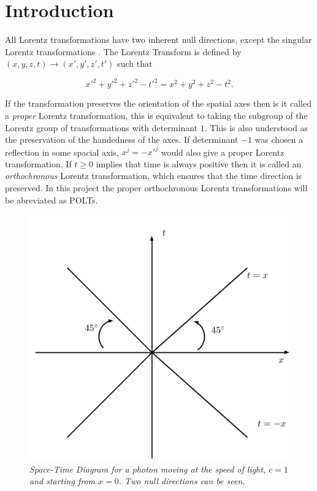 \section{Introduction}

All Lorentz transformations have two inherent null directions, except the singular Lorentz transformations \cite[p. 85]{Relativity_Synge}. The Lorentz Transform is defined by $(x,y,z,t) \rightarrow (x',y',z',t')$ such that

\begin{equation*}
{x'}^2 + {y'}^2 + {z'}^2 - {t'}^2 = x^2 + y^2 + z^2 - t^2.
\end{equation*}

\noindent If the transformation preserves the orientation of the spatial axes then is it called a \textit{proper} Lorentz transformation, this is equivalent to taking the subgroup of the Lorentz group of transformations with determinant $1$. This is also understood as the preservation of the handedness of the axes. If determinant $-1$ was chosen a reflection in some spacial axis, $x^j = -{x'}^j$ would also give a proper Lorentz transformation. If $t \geq 0$ implies that time is always positive then it is called an \textit{orthochronous} Lorentz transformation, which ensures that the time direction is preserved. In this project the proper orthochronous Lorentz transformations will be abreviated as POLTs.

\begin{figure}[h!]
\begin{center}
\caption{\textit{Space-Time Diagram for a photon moving at the speed of light, $c=1$ and starting from $x = 0$. Two null directions can be seen.}}
\label{figure_Photon_Space_Time}
\includegraphics[scale=0.8]{figs/1_1.jpg}
\end{center}
\end{figure}

